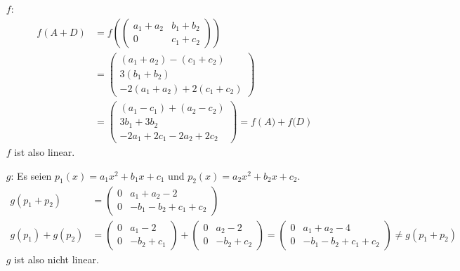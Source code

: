 \documentclass{../mfa}
\begin{document}
\maketitle
\renewcommand{\v}[1]{\mbf{v}_{#1}}
\section{}
\subsection{}
\begin{itemize}
   \item[$f$:] \begin{align*}
         f\left(A+D\right) &= f\left(\begin{pmatrix} a_1 + a_2 & b_1 + b_2 \\ 0 & c_1 + c_2
   \end{pmatrix}\right) \\
   &= \begin{pmatrix}
   (a_1 + a_2) - (c_1 + c_2) \\
   3(b_1 + b_2) \\
   -2(a_1 + a_2) + 2(c_1 + c_2)
\end{pmatrix} \\
&= \begin{pmatrix}
(a_1 - c_1) + (a_2 - c_2) \\
3b_1 + 3b_2 \\
-2a_1 + 2c_1 - 2a_2 + 2c_2
\end{pmatrix} = f\left(A) + f(D\right)
\end{align*}
$f$ ist also linear.
\item[$g$:] Es seien $p_1(x) = a_1x^2 + b_1x + c_1$ und $p_2(x) = a_2x^2 + b_2x
   + c_2$.
   \begin{align*}
      g(p_1 + p_2) &= \begin{pmatrix}
      0 & a_1 + a_2 - 2 \\
      0 & -b_1 -b_2 + c_1 + c_2
   \end{pmatrix} \\
   g(p_1) + g(p_2) &= \begin{pmatrix}
   0 & a_1 - 2 \\
   0 & -b_2 + c_1
\end{pmatrix} + \begin{pmatrix}
   0 & a_2 - 2 \\
   0 & -b_2 + c_2
\end{pmatrix} = \begin{pmatrix}
   0 & a_1 + a_2 - 4 \\
   0 & -b_1 -b_2 + c_1 + c_2
\end{pmatrix} \neq g(p_1 + p_2)
   \end{align*}
   $g$ ist also nicht linear.
\end{itemize}
\end{document}
